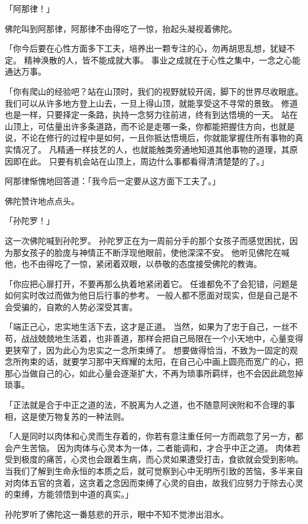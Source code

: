 \documentclass[twoside,openany]{book}
\begin{document}
「阿那律！」

佛陀叫到阿那律，阿那律不由得吃了一惊，抬起头凝视着佛陀。

「你今后要在心性方面多下工夫，培养出一颗专注的心，勿再胡思乱想，犹疑不定。
精神涣散的人，皆不能成就大事。
事业之成就在于心性之集中，一念之心能通达万事。

「你有爬山的经验吧？站在山顶时，我们的视野就较开阔，脚下的世界尽收眼底。
我们可以从许多地方登上山去，一旦上得山顶，就能享受这不寻常的景致。
修道也是一样，只要择定一条路，执持一念努力往前进，终有到达悟境的一天。
站在山顶上，可估量出许多条道路，而不论是走哪一条，你都能把握住方向，也就是说，不论在修行的过程中是如何，一且你抵达悟境后，你就能掌握住所有事物的真实情况了。
凡精通一样技艺的人，也就能触类旁通地知道其他事物的道理，其原因即在此。
只要有机会站在山顶上，周边什么事都看得清清楚楚的了。」

阿那律惭愧地回答道：「我今后一定要从这方面下工夫了。」

佛陀赞许地点点头。

「孙陀罗！」

这一次佛陀喊到孙陀罗。
孙陀罗正在为一周前分手的那个女孩子而感觉困扰，因为那女孩子的脸庞与神情正不断浮现他眼前，使他深深不安。
他听见佛陀在喊他，也不由得吃了一惊，紧闭着双眼，以恭敬的态度接受佛陀的教诲。

「你应把心扉打开，不要再那么执着地紧闭着它。
任谁都免不了会犯错，问题是如何实时改过而做为他日后行事的参考。
一般人都不愿面对现实，但是自己是不会受骗的，自欺的人势必深受其害。

「端正己心，忠实地生活下去，这才是正道。
当然，如果为了忠于自己，一丝不苟，战战兢兢地生活着，也非善道，那样会把自己局限在一个小天地中，心量变得更狭窄了，因为此心为忠实之一念所束缚了。
想要做得恰当，不致为一固定的观念所拘束的话，就要学习那中天辉耀的太阳，在自己心中画上圆亮而宽广的心，把那心当做自己的心，如此心量会逐渐扩大，不再为琐事所羁绊，也不会因此疏忽掉琐事。

「正法就是合于中正之道的法，不脱离为人之道，也不随意阿谀附和不合理的事相，这是使万物复苏的一种法则。

「人是同时以肉体和心灵而生存着的，你若有意注重任何一方而疏忽了另一方，都会产生苦恼。
因为肉体与心灵本为一体，二者能调和，才合乎中正之道。
肉体若受到极度的痛苦，心灵也会跟着生病，而心灵如果遭受打击，食欲就会受到影响。
当我们了解到生命永恒的本质之后，就可觉察到心中无明所引致的苦恼，多半来自对肉体五官的贪着，这贪着之念因而束缚了心灵的自由，故我们应努力于除去心灵的束缚，方能领悟到中道的真实。」

孙陀罗听了佛陀这一番慈悲的开示，眼中不知不觉渗出泪水。
\end{document}
